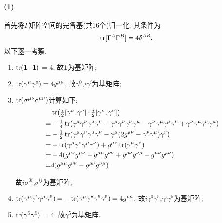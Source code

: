 \paragraph*{(1)}
首先将$\Gamma$矩阵空间的完备基(共16个)归一化, 其条件为
\begin{equation}
  \operatorname{tr}[\Gamma^A \Gamma^B]= 4\delta^{AB},
\end{equation}
以下逐一考察.

\begin{enumerate}
  \item $\operatorname{tr}(\mathbf{1}\cdot\mathbf{1})$ = 4, 故$\mathbf{1}$为基矩阵;
  \item $\operatorname{tr}(\gamma^\mu\gamma^\mu) = 4g^{\mu\mu}$, 故$\gamma^0$,$i\gamma^i$为基矩阵;
  \item $\operatorname{tr}(\sigma^{\mu\nu}\sigma^{\mu\nu})$计算如下:
        \begin{equation}
          \begin{aligned}
              & \operatorname{tr}\bigl(\tfrac{i}{2}[\gamma^\mu,\gamma^\nu]\cdot \tfrac{i}{2}[\gamma^\mu,\gamma^\nu]\bigr)                                                                                                 \\
            = & -\tfrac{1}{4}\operatorname{tr}(\gamma^\mu\gamma^\nu\gamma^\mu\gamma^\nu - \gamma^\mu\gamma^\nu\gamma^\nu\gamma^\mu - \gamma^\nu\gamma^\mu\gamma^\mu\gamma^\nu + \gamma^\nu\gamma^\mu\gamma^\nu\gamma^\mu) \\
            = & -\tfrac{1}{2}\operatorname{tr}(\gamma^\mu\gamma^\nu\gamma^\mu\gamma^\nu - \gamma^\mu(2g^{\mu\nu}-\gamma^\nu\gamma^\mu)\gamma^\nu)                                                                         \\
            = & -\operatorname{tr}(\gamma^\mu\gamma^\nu\gamma^\mu\gamma^\nu) + g^{\mu\nu}\operatorname{tr}(\gamma^\mu\gamma^\nu)                                                                                                        \\
            = & -4(g^{\mu\nu}g^{\mu\nu}-g^{\mu\mu}g^{\nu\nu}+g^{\mu\nu}g^{\nu\mu}-g^{\mu\nu}g^{\mu\nu})                                                                                                     \\
            = & 4(g^{\mu\mu}g^{\nu\nu} - g^{\mu\nu}g^{\nu\mu}).
          \end{aligned}
        \end{equation}

        故$i\sigma^{0i}$,$\sigma^{ij}$为基矩阵;
  \item $\operatorname{tr}(\gamma^\mu\gamma^5\gamma^\mu\gamma^5) = -\operatorname{tr}(\gamma^\mu\gamma^\mu\gamma^5\gamma^5) = 4g^{\mu\mu}$, 故$i\gamma^0\gamma^5$,$\gamma^i\gamma^5$为基矩阵;
  \item $\operatorname{tr}(\gamma^5\gamma^5)$ = 4, 故$\gamma^5$为基矩阵.
\end{enumerate}

